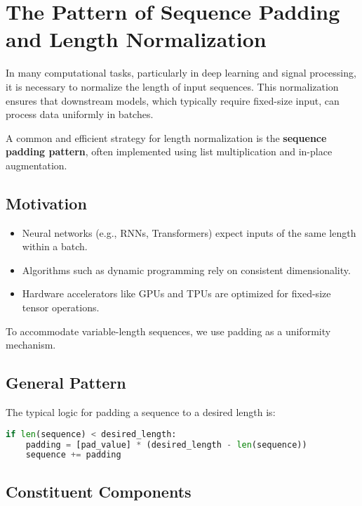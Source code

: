 \section{The Pattern of Sequence Padding and Length Normalization}

In many computational tasks, particularly in deep learning and signal processing, it is necessary to normalize the length of input sequences. This normalization ensures that downstream models, which typically require fixed-size input, can process data uniformly in batches.

A common and efficient strategy for length normalization is the \textbf{sequence padding pattern}, often implemented using list multiplication and in-place augmentation.

\subsection*{Motivation}

\begin{itemize}
	\item Neural networks (e.g., RNNs, Transformers) expect inputs of the same length within a batch.
	\item Algorithms such as dynamic programming rely on consistent dimensionality.
	\item Hardware accelerators like GPUs and TPUs are optimized for fixed-size tensor operations.
\end{itemize}

To accommodate variable-length sequences, we use padding as a uniformity mechanism.

\subsection*{General Pattern}

The typical logic for padding a sequence to a desired length is:

\begin{lstlisting}[language=Python, caption={Basic sequence padding pattern}]
	if len(sequence) < desired_length:
	padding = [pad_value] * (desired_length - len(sequence))
	sequence += padding
\end{lstlisting}

\subsection*{Constituent Components}

